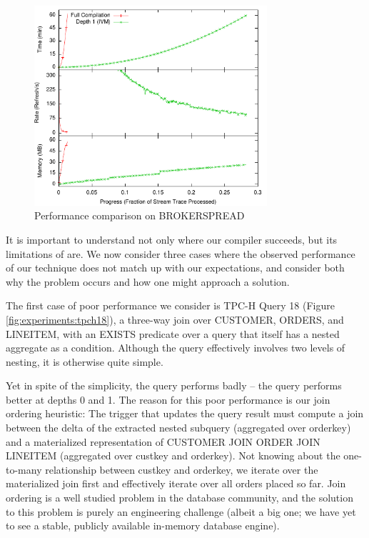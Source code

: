\begin{figure}
\begin{center}
\includegraphics[width=3.4in]{../graphs/graphs/unified_brokerspread.pdf}
\caption{Performance comparison on BROKERSPREAD}
\label{fig:experiments:brokerspread}
\end{center}
\end{figure}

It is important to understand not only where our compiler succeeds, but its limitations of are.  We now consider three cases where the observed performance of our technique does not match up with our expectations, and consider both why the problem occurs and how one might approach a solution.

The first case of poor performance we consider is TPC-H Query 18 (Figure \ref{fig:experiments:tpch18}), a three-way join over CUSTOMER, ORDERS, and LINEITEM, with an EXISTS predicate over a query that itself has a nested aggregate as a condition.  Although the query effectively involves two levels of nesting, it is otherwise quite simple.

Yet in spite of the simplicity, the query performs badly -- the query performs better at depths 0 and 1.  The reason for this poor performance is our join ordering heuristic: The trigger that updates the query result must compute a join between the delta of the extracted nested subquery (aggregated over orderkey) and a materialized representation of CUSTOMER JOIN ORDER JOIN LINEITEM (aggregated over custkey and orderkey).  Not knowing about the one-to-many relationship between custkey and orderkey, we iterate over the materialized join first and effectively iterate over all orders placed so far.  Join ordering is a well studied problem in the database community, and the solution to this problem is purely an engineering challenge (albeit a big one; we have yet to see a stable, publicly available in-memory database engine).  

